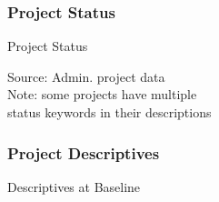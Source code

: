 \documentclass[aspectratio=149]{beamer}
\begin{document}

\begin{frame}
\frametitle{Project Status}
\centering
\begin{table}
\caption{Project Status}

\end{table}

\footnotesize{Source: Admin. project data} \\
\vspace{.1cm}
\footnotesize{Note: some projects have multiple \\ status keywords in their descriptions}
\end{frame}



\begin{frame}

\frametitle{Project Descriptives}

\centering
\begin{table}
\caption{Descriptives at Baseline}

\end{table}

\end{frame}
\end{document}
